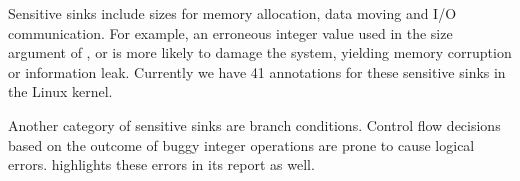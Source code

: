 Sensitive sinks include sizes for memory allocation, data moving and I/O
communication. For example, an erroneous integer value used in the size
argument of ,  or 
is more likely to damage the system, yielding memory corruption or information
leak. Currently we have 41 annotations for these sensitive sinks in the Linux
kernel.

Another category of sensitive sinks are branch conditions. Control flow
decisions based on the outcome of buggy integer operations are prone to cause
logical errors. \sys highlights these errors in its report as well.

